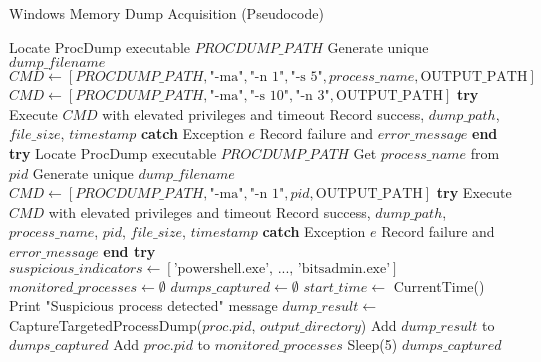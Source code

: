 \begin{algorithm}[!htbp]
\caption{Windows Memory Dump Acquisition (Pseudocode)}
\label{alg:windows-dump}
\begin{algorithmic}[1]
    \State Locate ProcDump executable $PROCDUMP\_PATH$
    \State Generate unique $dump\_filename$
        \State $CMD \leftarrow [PROCDUMP\_PATH, \text{"-ma"}, \text{"-n 1"}, \text{"-s 5"}, process\_name, \text{OUTPUT\_PATH}]$
    \Else
        \State $CMD \leftarrow [PROCDUMP\_PATH, \text{"-ma"}, \text{"-s 10"}, \text{"-n 3"}, \text{OUTPUT\_PATH}]$
    \EndIf
    \State \textbf{try}
        \State Execute $CMD$ with elevated privileges and timeout
        \State Record success, $dump\_path$, $file\_size$, $timestamp$
    \State \textbf{catch} {Exception $e$}
        \State Record failure and $error\_message$
    \State \textbf{end try}
\EndProcedure
\Statex
{}
    \State Locate ProcDump executable $PROCDUMP\_PATH$
    \State Get $process\_name$ from $pid$
    \State Generate unique $dump\_filename$
    \State $CMD \leftarrow [PROCDUMP\_PATH, \text{"-ma"}, \text{"-n 1"}, pid, \text{OUTPUT\_PATH}]$
    \State \textbf{try}
        \State Execute $CMD$ with elevated privileges and timeout
        \State Record success, $dump\_path$, $process\_name$, $pid$, $file\_size$, $timestamp$
    \State \textbf{catch} {Exception $e$}
        \State Record failure and $error\_message$
    \State \textbf{end try}
\EndProcedure
\Statex
{}
    \State $suspicious\_indicators \leftarrow [ \text{'powershell.exe', ..., 'bitsadmin.exe'} ]$
    \State $monitored\_processes \leftarrow \emptyset$
    \State $dumps\_captured \leftarrow \emptyset$
    \State $start\_time \leftarrow$ CurrentTime()
                \State Print "Suspicious process detected" message
                \State $dump\_result \leftarrow$ CaptureTargetedProcessDump($proc.pid$, $output\_directory$)
                    \State Add $dump\_result$ to $dumps\_captured$
                    \State Add $proc.pid$ to $monitored\_processes$
                \EndIf
            \EndIf
        \EndFor
        \State Sleep(5) 
    \EndWhile
    \Return $dumps\_captured$
\EndProcedure
\end{algorithmic}
\end{algorithm}

